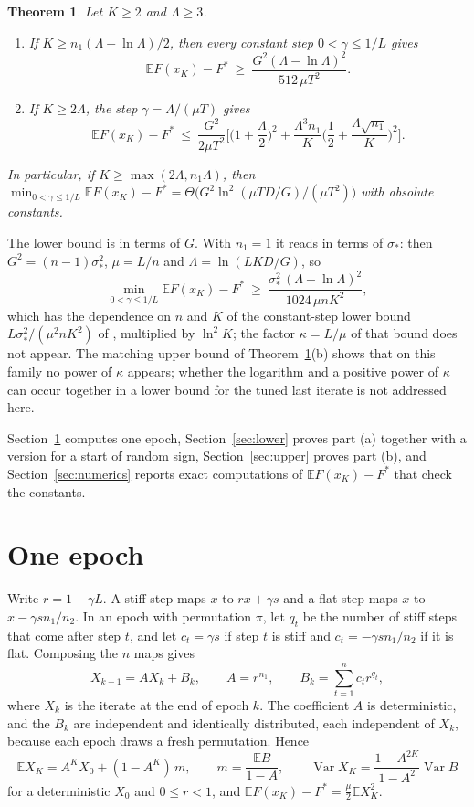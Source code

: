 \documentclass[11pt]{amsart}
\newtheorem{theorem}{Theorem}[section]
\theoremstyle{remark}\newtheorem{remark}[theorem]{Remark}
\newcommand{\E}{\mathbb{E}}
\newcommand{\Var}{\operatorname{Var}}
\begin{document}
\begin{theorem}\label{thm:main}
Let $K\ge2$ and $\Lambda\ge3$.
\begin{enumerate}
\item[(a)] If $K\ge n_1(\Lambda-\ln\Lambda)/2$, then every constant step $0<\gamma\le1/L$ gives
\[
\E F(x_K)-F^*\ \ge\ \frac{G^2(\Lambda-\ln\Lambda)^2}{512\,\mu T^2}.
\]
\item[(b)] If $K\ge2\Lambda$, the step $\gamma=\Lambda/(\mu T)$ gives
\[
\E F(x_K)-F^*\ \le\ \frac{G^2}{2\mu T^2}\Big[\Big(1+\frac{\Lambda}{2}\Big)^2
+\frac{\Lambda^3n_1}{K}\Big(\frac12+\frac{\Lambda\sqrt{n_1}}{K}\Big)^2\Big].
\]
\end{enumerate}
In particular, if $K\ge\max(2\Lambda,n_1\Lambda)$, then
$\min_{0<\gamma\le1/L}\E F(x_K)-F^*=\Theta\big(G^2\ln^2(\mu TD/G)/(\mu T^2)\big)$ with absolute constants.
\end{theorem}

The lower bound is in terms of $G$. With $n_1=1$ it reads in terms of $\sigma_*$: then $G^2=(n-1)\sigma_*^2$,
$\mu=L/n$ and $\Lambda=\ln(LKD/G)$, so
\[
\min_{0<\gamma\le 1/L}\E F(x_K)-F^*\ \ge\ \frac{\sigma_*^2\,(\Lambda-\ln\Lambda)^2}{1024\,\mu nK^2},
\]
which has the dependence on $n$ and $K$ of the constant-step lower bound $L\sigma_*^2/(\mu^2nK^2)$ of \cite{ss21,cly},
multiplied by $\ln^2K$; the factor $\kappa=L/\mu$ of that bound does not appear. The matching upper bound of Theorem~\ref{thm:main}(b) shows that on this family no power of
$\kappa$ appears; whether the logarithm and a positive power of $\kappa$ can occur together in a lower bound for the
tuned last iterate is not addressed here.

Section~\ref{sec:epoch} computes one epoch, Section~\ref{sec:lower} proves part (a) together with a version for a start
of random sign, Section~\ref{sec:upper} proves part (b), and Section~\ref{sec:numerics} reports exact computations of
$\E F(x_K)-F^*$ that check the constants.

\section{One epoch}\label{sec:epoch}

Write $r=1-\gamma L$. A stiff step maps $x$ to $rx+\gamma s$ and a flat step maps $x$ to $x-\gamma sn_1/n_2$. In an epoch
with permutation $\pi$, let $q_t$ be the number of stiff steps that come after step $t$, and let $c_t=\gamma s$ if step
$t$ is stiff and $c_t=-\gamma sn_1/n_2$ if it is flat. Composing the $n$ maps gives
\begin{equation}\label{eq:epoch}
X_{k+1}=AX_k+B_k,\qquad A=r^{n_1},\qquad B_k=\sum_{t=1}^nc_tr^{q_t},
\end{equation}
where $X_k$ is the iterate at the end of epoch $k$. The coefficient $A$ is deterministic, and the $B_k$ are independent
and identically distributed, each independent of $X_k$, because each epoch draws a fresh permutation. Hence
\begin{equation}\label{eq:moments}
\E X_K=A^KX_0+(1-A^K)\,m,\qquad m=\frac{\E B}{1-A},\qquad
\Var X_K=\frac{1-A^{2K}}{1-A^2}\Var B
\end{equation}
for a deterministic $X_0$ and $0\le r<1$, and $\E F(x_K)-F^*=\frac\mu2\E X_K^2$.
\end{document}
